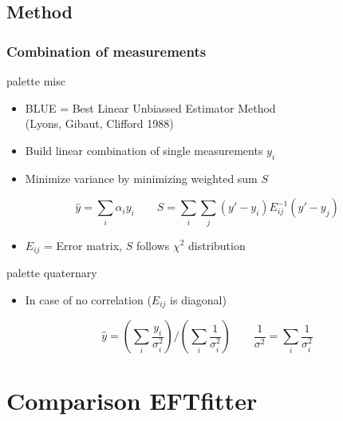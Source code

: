 \documentclass{beamer}
\begin{document}
\subsection{Method}
\begin{frame}
\frametitle{Combination of measurements}
\vspace{-5mm}
\begin{beamercolorbox}[rounded=true,shadow=true]{palette misc}
	\begin{itemize}\vspace{-2mm}
		\item BLUE = Best Linear Unbiassed Estimator Method\\
		\hspace{3mm}(Lyons, Gibaut, Clifford 1988)
		\item Build linear combination of single measurements $y_i$
		\item Minimize variance by minimizing weighted sum $S$
	\end{itemize}
	\begin{equation*}
		\hat{y} = \sum_i \alpha_i y_i \qquad S = \sum_i \sum_j (y' - y_i) E^{-1}_{ij} (y' - y_j)
	\end{equation*}
	\begin{itemize}\vspace{-3mm}
		\item $E_{ij}$ = Error matrix, $S$ follows $\chi^2$ distribution
	\end{itemize}
\end{beamercolorbox}
\begin{beamercolorbox}[rounded=true,shadow=true]{palette quaternary}
	\begin{itemize}\vspace{-3mm}
		\item In case of no correlation ($E_{ij}$ is diagonal)
	\end{itemize}
	\begin{equation*}
		\hat{y} = \left(\sum_i \frac{y_i}{\sigma_i^2}\right) / \left(\sum_i \frac{1}{\sigma^2_i}\right) \qquad\frac{1}{\sigma^2} = \sum_i \frac{1}{\sigma^2_i}
	\end{equation*}
\end{beamercolorbox}
\end{frame}

\section{Comparison EFTfitter}
\end{document}
